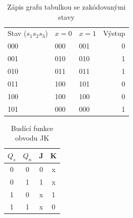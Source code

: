 \begin{table}[h]
  \centering
  \caption{Zápis grafu tabulkou se zakódovanými stavy}
    \begin{tabular}{|l|l|l|r|}
    Stav ($s_1 s_2 s_3$) &$x=0$  & $x=1$ & Výstup \\

    000   & 000   & 001   & 0 \\

    001   & 010   & 010   & 1 \\

    010   & 011   & 011   & 1 \\

    011   & 100   & 101   & 0 \\

    100   & 100   & 100   & 0 \\

    101   & 000   & 000   & 1 \\
    \end{tabular}%
  \label{tab:addlabel}%
\end{table}%

\begin{table}[h]
  \centering
  \caption{Budící funkce obvodu JK}
    \begin{tabular}{cccc}
    $Q_s$    & $Q_n$    & J     & K \\
      \hline
    0     & 0     & 0     & x \\
    0     & 1     & 1     & x \\
    1     & 0     & x     & 1 \\
    1     & 1     & x     & 0 \\
    \end{tabular}%
  \label{tab:addlabel}%
\end{table}%

